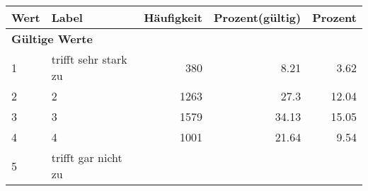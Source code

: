      \begin{longtable}{lXrrr}
     \toprule
     \textbf{Wert} & \textbf{Label} & \textbf{Häufigkeit} & \textbf{Prozent(gültig)} & \textbf{Prozent} \\
     \endhead
     \midrule
     \multicolumn{5}{l}{\textbf{Gültige Werte}}\\

     1 &
     \multicolumn{1}{X}{ trifft sehr stark zu   } &


       \num{380} &
       \num[round-mode=places,round-precision=2]{8.21} &
         \num[round-mode=places,round-precision=2]{3.62} \\

     2 &
     \multicolumn{1}{X}{ 2   } &


       \num{1263} &
       \num[round-mode=places,round-precision=2]{27.3} &
         \num[round-mode=places,round-precision=2]{12.04} \\

     3 &
     \multicolumn{1}{X}{ 3   } &


       \num{1579} &
       \num[round-mode=places,round-precision=2]{34.13} &
         \num[round-mode=places,round-precision=2]{15.05} \\

     4 &
     \multicolumn{1}{X}{ 4   } &


       \num{1001} &
       \num[round-mode=places,round-precision=2]{21.64} &
         \num[round-mode=places,round-precision=2]{9.54} \\

     5 &
     \multicolumn{1}{X}{ trifft gar nicht zu   } &



\end{longtable}
